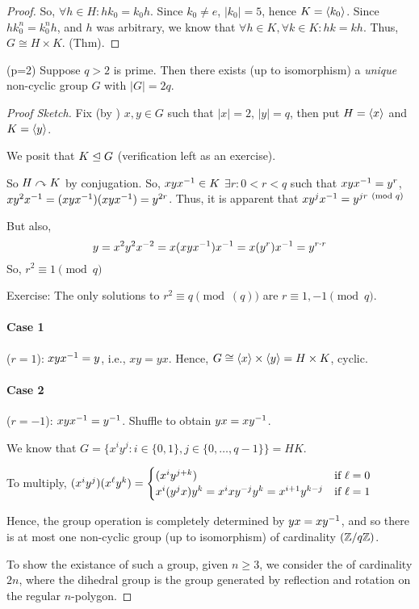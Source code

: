 \documentclass[notes.tex]{subfiles}
\begin{document}
\begin{proof}
	So, $\forall h\in H: hk_0 = k_0h$.
	Since $k_0\ne e$, $|k_0| = 5$, hence $K = \left\langle{k_0}\right\rangle$.
	Since $hk_0^n = k_0^nh$, and $h$ was arbitrary, we know that
	$\forall h\in K, \forall k\in K: hk=kh$. Thus, $G\cong H\times K$.
	\qedhere(Thm).
\end{proof}

\begin{proposition}
	(p=2) Suppose $q > 2$ is prime. Then there exists (up to isomorphism) a \emph{unique} non-cyclic group $G$ with $|G| = 2q$.
\end{proposition}

\begin{proof}[Proof Sketch]
	Fix (by ) $x, y\in G$ such that $|x| = 2$, $|y| = q$, then put $H = \left\langle{x}\right\rangle$ and $K = \left\langle{y}\right\rangle$.

	We posit that $K\trianglelefteq G$ (verification left as an exercise).

	So $H\curvearrowright K$ by conjugation.
	So, $xy{x}^{-1}\in K$ $\exists r: 0 < r < q$ such that $xy{x}^{-1} = y^r$,
	$xy^2{x}^{-1}=(xy{x}^{-1})(xy{x}^{-1}) = y^{2r}$. Thus, it is apparent that $xy^j{x}^{-1} = y^{jr\pmod q}$

	But also, \[
		y
		=x^2y^2x^{-2}
		=x(xy{x}^{-1}){x}^{-1}
		=x(y^r){x}^{-1}
		=y^{r\cdot r}
	\]
	So, $r^2\equiv 1\pmod q$

	Exercise: The only solutions to $r^2\equiv q\pmod(q)$ are $r\equiv 1, -1\pmod q$.

	\paragraph{Case 1} ($r=1$): $xy{x}^{-1}  = y$, i.e., $xy = yx$. Hence, $G\cong \left\langle{x}\right\rangle\times \left\langle{y}\right\rangle = H\times K$, cyclic.
	\paragraph{Case 2} ($r=-1$): $xy{x}^{-1} = {y}^{-1}$. Shuffle to obtain $yx = x{y}^{-1}$.

	We know that $G = \{x^iy^j : i\in \{0, 1\}, j\in \{0, \ldots, q-1\}\} = HK$.

	To multiply, $(x^iy^j)(x^\ell y^k) = \begin{cases}
		(x^iy^{j+k}) &\text{if } \ell = 0\\
		x^i(y^jx)y^k = x^ixy^{-j}y^k = x^{i+1}y^{k-j} &\text{if } \ell = 1
	\end{cases}$

	Hence, the group operation is completely determined by $yx=x{y}^{-1}$, and so there is at most one non-cyclic group (up to isomorphism) of cardinality $(\mathbb{Z}/{q}\mathbb{Z})$.

	To show the existance of such a group, given $n \ge 3$, we consider the  of cardinality $2n$, where the dihedral group is the group generated by reflection and rotation on the regular $n$-polygon.
\end{proof}
\end{document}
